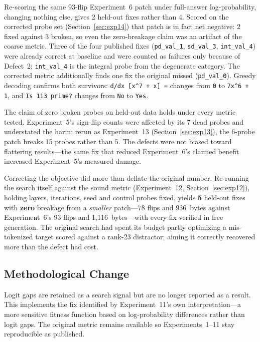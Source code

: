 \documentclass[11pt,a4paper]{article}
\begin{document}
Re-scoring the same 93-flip Experiment~6 patch under full-answer log-probability,
changing nothing else, gives 2 held-out fixes rather than 4. Scored on the
corrected probe set (Section~\ref{sec:exp14}) that patch is in fact net negative:
2 fixed against 3 broken, so even the zero-breakage claim was an artifact of the
coarse metric.
Three of the four published fixes (\texttt{pd\_val\_1}, \texttt{sd\_val\_3},
\texttt{int\_val\_4}) were already correct at baseline and were counted as
failures only because of Defect~2; \texttt{int\_val\_4} is the integral probe from
the degenerate category. The corrected metric additionally finds one fix the
original missed (\texttt{pd\_val\_0}). Greedy decoding confirms both survivors:
\verb|d/dx [x^7 + x] =| changes from \texttt{0} to \verb|7x^6 + 1|, and
\texttt{Is 113 prime?} changes from \texttt{No} to \texttt{Yes}.

The claim of zero broken probes on held-out data holds under every metric tested.
Experiment~5's sign-flip counts were affected by its 7 dead probes and
understated the harm: rerun as Experiment~13 (Section~\ref{sec:exp13}), the
6-probe patch breaks 15 probes rather than 5. The defects were not biased toward
flattering results---the same fix that reduced Experiment~6's claimed benefit
increased Experiment~5's measured damage.

Correcting the objective did more than deflate the original number. Re-running
the search itself against the sound metric (Experiment~12, Section~\ref{sec:exp12}),
holding layers, iterations, seed and control probes fixed, yields \textbf{5}
held-out fixes with \textbf{zero} breakage from a \emph{smaller} patch---78 flips
and 936~bytes against Experiment~6's 93 flips and 1{,}116~bytes---with every fix
verified in free generation. The original search had spent its budget partly
optimizing a mis-tokenized target scored against a rank-23 distractor; aiming it
correctly recovered more than the defect had cost.

\subsection{Methodological Change}

Logit gaps are retained as a search signal but are no longer reported as a
result. This implements the fix identified by Experiment~11's own
interpretation---a more sensitive fitness function based on log-probability
differences rather than logit gaps. The original metric remains available so
Experiments~1--11 stay reproducible as published.
\end{document}
